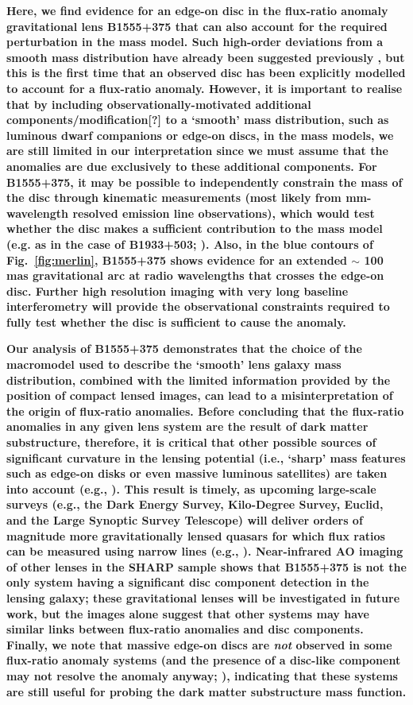 \documentclass[a4paper,fleqn,usenatbib,useAMS]{mnras}
\begin{document}
{\bf Here, we find evidence for an edge-on disc in the flux-ratio
  anomaly gravitational lens B1555+375 that can also account for the
  required perturbation in the mass model. Such high-order deviations
  from a smooth mass distribution have already been suggested
  previously \citep{evans03, congdon05}, but this is the first time
  that an observed disc has been explicitly modelled to account for a
  flux-ratio anomaly. However, it is important to realise that by
  including observationally-motivated additional components/modification[?] to a `smooth' mass
  distribution, such as luminous dwarf companions or edge-on discs, in
  the mass models, we are still limited in our interpretation since we
  must assume that the anomalies are due exclusively to these
  additional components.  For B1555+375, it may be possible to
  independently constrain the mass of the disc through kinematic
  measurements (most likely from mm-wavelength resolved emission line
  observations), which would test whether the disc makes a sufficient
  contribution to the mass model (e.g. as in the case of B1933+503;
  \citet{suyu12}). Also, in the blue contours of Fig.~\ref{fig:merlin}, B1555+375 shows
  evidence for an extended $\sim$ 100 mas gravitational arc at radio
  wavelengths that crosses the edge-on disc. Further high resolution
  imaging with very long baseline interferometry will provide the
  observational constraints required to fully test whether the disc is
  sufficient to cause the anomaly.}

\textbf{ Our analysis of B1555+375 demonstrates that the choice of the macromodel used to describe the `smooth' lens galaxy mass distribution, combined with the limited information provided by the position of compact lensed images, can lead to a misinterpretation of the origin of flux-ratio anomalies. Before concluding that the flux-ratio anomalies in any given lens system are the result of dark matter substructure, therefore, it is critical that other possible sources of significant curvature in the lensing potential (i.e., `sharp' mass features such as edge-on disks or even massive luminous satellites) are taken into account 
 (e.g., \citet{Xu15}). This result is timely, as upcoming large-scale surveys (e.g., the Dark Energy Survey, Kilo-Degree Survey, Euclid, and the Large Synoptic Survey Telescope) will deliver orders of magnitude more gravitationally lensed quasars for which flux ratios can
  be measured using narrow lines (e.g., \citet{N14}). Near-infrared AO imaging of other lenses in the SHARP sample shows that B1555+375 is not the only system having a significant disc component detection in the lensing galaxy; these gravitational lenses will be investigated in future work, but the images alone suggest that other systems may have similar links between flux-ratio anomalies and disc components. Finally, we note that massive edge-on discs are \textit{not} observed in some flux-ratio anomaly systems (and the presence of a disc-like component may not resolve the anomaly anyway; \citet{evans03}), indicating that these systems are still useful for probing the dark matter substructure mass function.}
\end{document}
